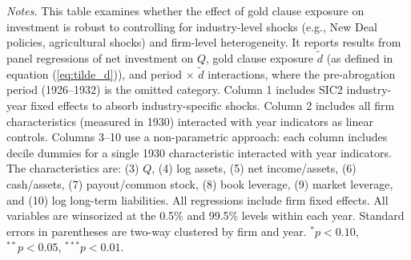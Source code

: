 \begin{landscape}
\begin{table}[t!]
\scriptsize{\textit{Notes.} This table examines whether the effect of gold clause exposure on investment is robust to controlling for industry-level shocks (e.g., New Deal policies, agricultural shocks) and firm-level heterogeneity. It reports results from panel regressions of net investment on $Q$, gold clause exposure $\tilde{d}$ (as defined in equation (\ref{eq:tilde_d})), and period $\times$ $\tilde{d}$ interactions, where the pre-abrogation period (1926--1932) is the omitted category. Column 1 includes SIC2 industry-year fixed effects to absorb industry-specific shocks. Column 2 includes all firm characteristics (measured in 1930) interacted with year indicators as linear controls. Columns 3--10 use a non-parametric approach: each column includes decile dummies for a single 1930 characteristic interacted with year indicators. The characteristics are: (3) $Q$, (4) log assets, (5) net income/assets, (6) cash/assets, (7) payout/common stock, (8) book leverage, (9) market leverage, and (10) log long-term liabilities. All regressions include firm fixed effects. All variables are winsorized at the 0.5\% and 99.5\% levels within each year. Standard errors in parentheses are two-way clustered by firm and year. $^{*}p<0.10$, $^{**}p<0.05$, $^{***}p<0.01$.}
\end{table}
\end{landscape}